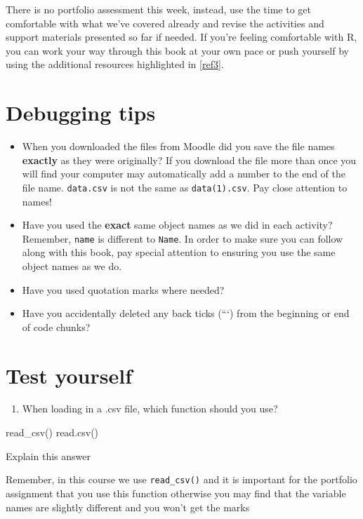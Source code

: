 \documentclass[]{book}
\providecommand{\tightlist}{%
  \setlength{\itemsep}{0pt}\setlength{\parskip}{0pt}}
\begin{document}
There is no portfolio assessment this week, instead, use the time to get comfortable with what we've covered already and revise the activities and support materials presented so far if needed. If you're feeling comfortable with R, you can work your way through this book at your own pace or push yourself by using the additional resources highlighted in \ref{ref3}.

\hypertarget{debugging-tips-1}{%
\section{Debugging tips}\label{debugging-tips-1}}

\begin{itemize}
\tightlist
\item
  When you downloaded the files from Moodle did you save the file names \textbf{exactly} as they were originally? If you download the file more than once you will find your computer may automatically add a number to the end of the file name. \texttt{data.csv} is not the same as \texttt{data(1).csv}. Pay close attention to names!
\item
  Have you used the \textbf{exact} same object names as we did in each activity? Remember, \texttt{name} is different to \texttt{Name}. In order to make sure you can follow along with this book, pay special attention to ensuring you use the same object names as we do.\\
\item
  Have you used quotation marks where needed?\\
\item
  Have you accidentally deleted any back ticks (```) from the beginning or end of code chunks?
\end{itemize}

\hypertarget{test-yourself-1}{%
\section{Test yourself}\label{test-yourself-1}}

\begin{enumerate}
\def\labelenumi{\arabic{enumi}.}
\tightlist
\item
  When loading in a .csv file, which function should you use?
\end{enumerate}

 read\_csv() read.csv()

Explain this answer

Remember, in this course we use \texttt{read\_csv()} and it is important for the portfolio assignment that you use this function otherwise you may find that the variable names are slightly different and you won't get the marks
\end{document}
